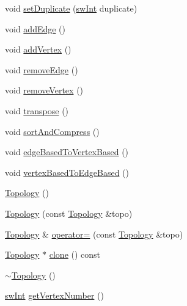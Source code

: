 \begin{DoxyCompactItemize}
\item 
void \mbox{\hyperlink{classUNAT_1_1Topology_a786790063b5399bb3bb8b6fc6761ca5a}{set\+Duplicate}} (\mbox{\hyperlink{include_2swMacro_8h_a113cf5f6b5377cdf3fac6aa4e443e9aa}{sw\+Int}} duplicate)
\item 
void \mbox{\hyperlink{classUNAT_1_1Topology_a6f341852613126c689a10a2785a08c55}{add\+Edge}} ()
\item 
void \mbox{\hyperlink{classUNAT_1_1Topology_adfc7a4148d5430ae7af6ed1d499875f7}{add\+Vertex}} ()
\item 
void \mbox{\hyperlink{classUNAT_1_1Topology_a359fdcc98879b6de79d9a9ea8221bc68}{remove\+Edge}} ()
\item 
void \mbox{\hyperlink{classUNAT_1_1Topology_a3116756821bb4fdedfe16f2f0256552c}{remove\+Vertex}} ()
\item 
void \mbox{\hyperlink{classUNAT_1_1Topology_aee69e4993644c249fdaaf55627309309}{transpose}} ()
\item 
void \mbox{\hyperlink{classUNAT_1_1Topology_a2293a4becd4f59f38364701e7ea7bf1d}{sort\+And\+Compress}} ()
\item 
void \mbox{\hyperlink{classUNAT_1_1Topology_aeac30ca87544104afb11344fdd5ac3a9}{edge\+Based\+To\+Vertex\+Based}} ()
\item 
void \mbox{\hyperlink{classUNAT_1_1Topology_a406ac8df118240b4245dac4e3d9ed634}{vertex\+Based\+To\+Edge\+Based}} ()
\item 
\mbox{\hyperlink{classUNAT_1_1Topology_abca137a381a1bdd9c44afa3056f1d45b}{Topology}} ()
\item 
\mbox{\hyperlink{classUNAT_1_1Topology_ae1c53ba557ce7d0c587dd46d1eb2b018}{Topology}} (const \mbox{\hyperlink{classUNAT_1_1Topology}{Topology}} \&topo)
\item 
\mbox{\hyperlink{classUNAT_1_1Topology}{Topology}} \& \mbox{\hyperlink{classUNAT_1_1Topology_a75f1187f0c29f844efb53a30e5ddf737}{operator=}} (const \mbox{\hyperlink{classUNAT_1_1Topology}{Topology}} \&topo)
\item 
\mbox{\hyperlink{classUNAT_1_1Topology}{Topology}} $\ast$ \mbox{\hyperlink{classUNAT_1_1Topology_acb0a82ccbd9db10c8e9ddfc73017587a}{clone}} () const
\item 
\mbox{\hyperlink{classUNAT_1_1Topology_a136b0445c89509d4d087a958b58e0d62}{$\sim$\+Topology}} ()
\item 
\mbox{\hyperlink{include_2swMacro_8h_a113cf5f6b5377cdf3fac6aa4e443e9aa}{sw\+Int}} \mbox{\hyperlink{classUNAT_1_1Topology_a7d1d4d508b6e0a44fb0b5f6e6f26a8a5}{get\+Vertex\+Number}} ()
\item 

\end{DoxyCompactItemize}
